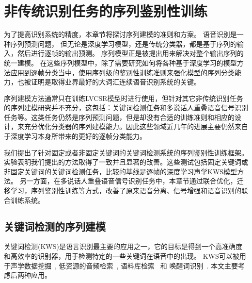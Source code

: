 

\chapter{非传统识别任务的序列鉴别性训练}
\label{chap:seqtrain}


为了提高识别系统的精度，本章节将探讨序列建模的准则和方案。
语音识别是一种序列预测问题，%
但无论是深度学习模型，还是传统分类器，都是基于序列的输入，然后进行逐帧的输出预测。
%
序列模型正是被提出用来解决对整个输出序列的统一建模。
在这些序列模型中，除了需要研究如何将各种基于深度学习的模型方法应用到逐帧分类当中，使用序列级的鉴别性训练准则来强化模型的序列分类能力，也被证明是取得业界最好的大词汇连续语音识别系统的关键。

序列建模方法通常只在训练LVCSR模型时进行使用，但针对其它非传统识别任务的序列建模研究并不充分，这包括：关键词检测任务和多说话人重叠语音信号识别任务等。这类任务仍然是序列预测问题，但是却没有合适的训练准则和相应的设计，来充分优化分类器的序列建模能力。因此这些领域近几年的进展主要仍然来自于深度学习本身所带来的更好的逐帧分类能力。

我们提出了针对固定或者非固定关键词的关键词检测系统的序列鉴别性训练框架。实验表明我们提出的方法取得了一致并且显著的改善。这些测试包括固定关键词或非固定关键词的关键词检测任务，比较的基线是逐帧的深度学习声学KWS模型方法。
%
另一方面，在多说话人重叠语音信号识别任务中，本章节通过联合优化，迁移学习，序列鉴别性训练等方式，改善了原来语音分离、信号增强和语音识别的联合训练系统。


\section{关键词检测的序列建模}
\label{chap:kws}


关键词检测(KWS)是语言识别最主要的应用之一，它的目标是得到一个高准确度和高效率的识别器，用于检测特定的一些关键词在语音中的出现。
KWS可以被用于声学数据挖掘~\cite{zhou2005data}, 低资源的音频检索~\cite{shen2009comparison}, 
语料库检索~\cite{garofolo2000trec} 和 唤醒词识别~\cite{chen2014small}. 本文主要考虑后两种应用。

